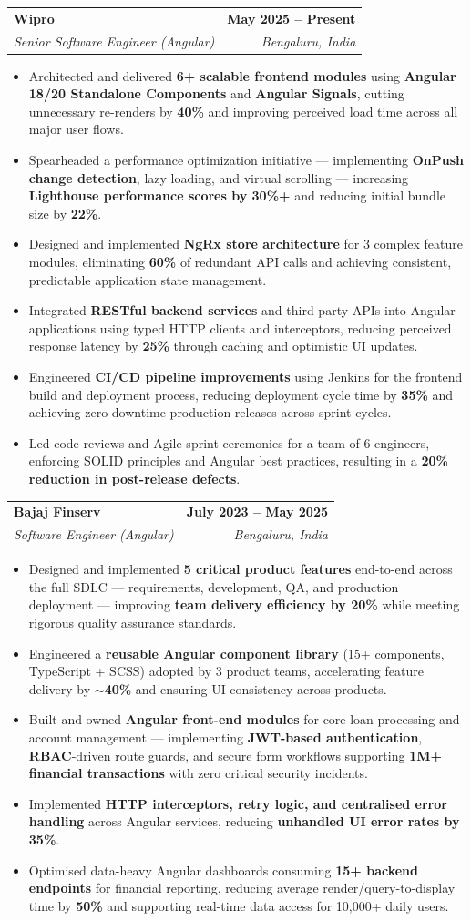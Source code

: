 \documentclass[letterpaper,10.5pt]{article}
\makeatletter
\newcommand{\resumeItem}[1]{
  \item\small{#1\vspace{-3pt}}
}
\newcommand{\resumeSubheading}[4]{
  \vspace{-3pt}\item
    \begin{tabular*}{1.0\textwidth}[t]{l@{\extracolsep{\fill}}r}
      \textbf{#1} & \textbf{\small #2} \\
      \textit{\small#3} & \textit{\small #4} \\
    \end{tabular*}\vspace{-8pt}
}
\newcommand{\resumeItemListStart}{\begin{itemize}[leftmargin=0.15in, itemsep=-1pt]}
\newcommand{\resumeItemListEnd}{\end{itemize}\vspace{-6pt}}
\makeatother
\begin{document}
  \resumeSubheading
    {Wipro}{May 2025 -- Present}
    {Senior Software Engineer (Angular)}{Bengaluru, India}
  \resumeItemListStart
    \resumeItem{Architected and delivered \textbf{6+ scalable frontend modules} using \textbf{Angular 18/20 Standalone Components} and \textbf{Angular Signals}, cutting unnecessary re-renders by \textbf{40\%} and improving perceived load time across all major user flows.}
    \resumeItem{Spearheaded a performance optimization initiative — implementing \textbf{OnPush change detection}, lazy loading, and virtual scrolling — increasing \textbf{Lighthouse performance scores by 30\%+} and reducing initial bundle size by \textbf{22\%}.}
    \resumeItem{Designed and implemented \textbf{NgRx store architecture} for 3 complex feature modules, eliminating \textbf{60\%} of redundant API calls and achieving consistent, predictable application state management.}
    \resumeItem{Integrated \textbf{RESTful backend services} and third-party APIs into Angular applications using typed HTTP clients and interceptors, reducing perceived response latency by \textbf{25\%} through caching and optimistic UI updates.}
    \resumeItem{Engineered \textbf{CI/CD pipeline improvements} using Jenkins for the frontend build and deployment process, reducing deployment cycle time by \textbf{35\%} and achieving zero-downtime production releases across sprint cycles.}
    \resumeItem{Led code reviews and Agile sprint ceremonies for a team of 6 engineers, enforcing SOLID principles and Angular best practices, resulting in a \textbf{20\% reduction in post-release defects}.}
  \resumeItemListEnd

  \resumeSubheading
    {Bajaj Finserv}{July 2023 -- May 2025}
    {Software Engineer (Angular)}{Bengaluru, India}
  \resumeItemListStart
    \resumeItem{Designed and implemented \textbf{5 critical product features} end-to-end across the full SDLC — requirements, development, QA, and production deployment — improving \textbf{team delivery efficiency by 20\%} while meeting rigorous quality assurance standards.}
    \resumeItem{Engineered a \textbf{reusable Angular component library} (15+ components, TypeScript + SCSS) adopted by 3 product teams, accelerating feature delivery by \textbf{$\sim$40\%} and ensuring UI consistency across products.}
    \resumeItem{Built and owned \textbf{Angular front-end modules} for core loan processing and account management — implementing \textbf{JWT-based authentication}, \textbf{RBAC}-driven route guards, and secure form workflows supporting \textbf{1M+ financial transactions} with zero critical security incidents.}
    \resumeItem{Implemented \textbf{HTTP interceptors, retry logic, and centralised error handling} across Angular services, reducing \textbf{unhandled UI error rates by 35\%}.}
    \resumeItem{Optimised data-heavy Angular dashboards consuming \textbf{15+ backend endpoints} for financial reporting, reducing average render/query-to-display time by \textbf{50\%} and supporting real-time data access for 10,000+ daily users.}
  \resumeItemListEnd
\end{document}
